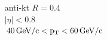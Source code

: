 \documentclass{beamer}
\begin{document}
\begin{frame}
\begin{columns}
\begin{column}{0.6\textwidth}
\begin{figure}
	\end{figure}
	\end{column}
    \begin{column}{0.4\textwidth}
	{
	anti-kt $R=0.4$ \\
	$\vert\eta\vert<0.8$ \\
	$40\,\rm{GeV/c}<p_T<60\,\rm{GeV/c}$
	}
	\end{column}
	\end{columns}
\end{frame}
\end{document}
